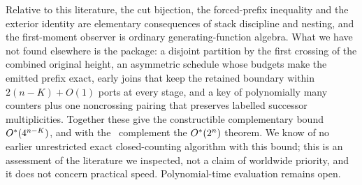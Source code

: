 Relative to this literature, the cut bijection, the forced-prefix inequality and
the exterior identity are elementary consequences of stack discipline and
nesting, and the first-moment observer is ordinary generating-function algebra.
What we have not found elsewhere is the package: a disjoint partition by the
first crossing of the combined original height, an asymmetric schedule whose
budgets make the emitted prefix exact, early joins that keep the retained
boundary within $2(n-K)+O(1)$ ports at every stage, and a key of polynomially
many counters plus one noncrossing pairing that preserves labelled successor
multiplicities. Together these give the constructible complementary bound
$O^{*}(4^{n-K})$, and with the \LOW\ complement the $O^{*}(2^{n})$ theorem. We
know of no earlier unrestricted exact closed-counting algorithm with this bound;
this is an assessment of the literature we inspected, not a claim of worldwide
priority, and it does not concern practical speed. Polynomial-time evaluation
remains open.
